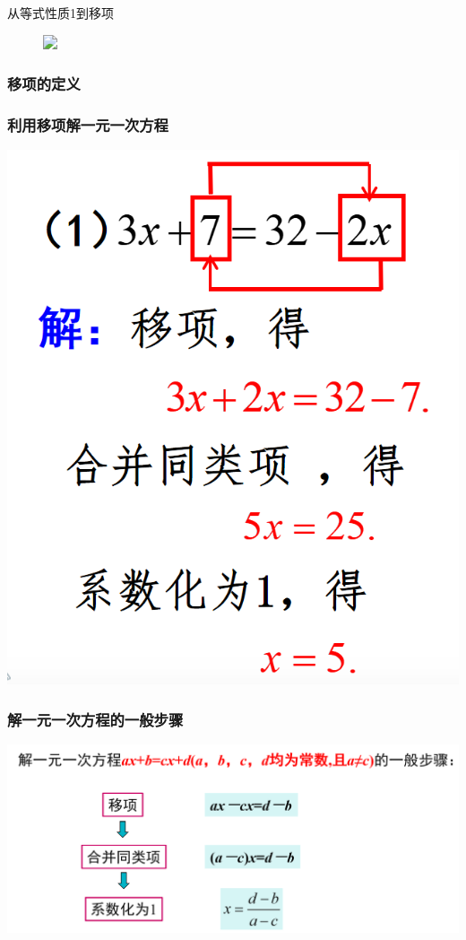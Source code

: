 \begin{frame}{从等式性质1到移项}

    \begin{figure}
        \includegraphics<2>[width=.8\textwidth]{assets/5.png}
    \end{figure}
\end{frame}

\begin{frame}
    \frametitle{移项的定义}

\end{frame}

\begin{frame}
    \frametitle{利用移项解一元一次方程}

    \includegraphics[width=.4\textwidth]{assets/7.png}
\end{frame}

\begin{frame}
    \frametitle{解一元一次方程的一般步骤}
    \includegraphics[width=.9\textwidth]{assets/8.png}
\end{frame}

